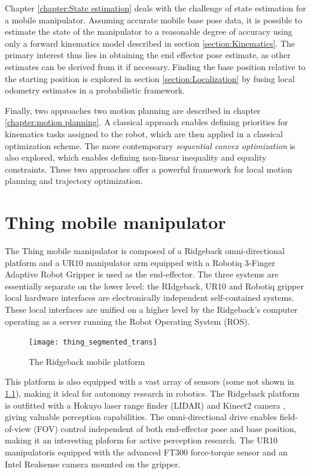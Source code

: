 \documentclass[times, utf8, diplomski, english]{fer}
\begin{document}
Chapter \ref{chapter:State estimation} deals with the challenge of state estimation for a mobile manipulator.
Assuming accurate mobile base pose data, it is possible to estimate the state of the manipulator to a reasonable degree of accuracy using only a forward kinematics model described in section \ref{section:Kinematics}.
The primary interest thus lies in obtaining the end effector pose estimate, as other estimates can be derived from it if necessary.
Finding the base position relative to the starting position is explored in section \ref{section:Localization} by fusing local odometry estimates in a probabilistic framework.

Finally, two approaches two motion planning are described in chapter \ref{chapter:motion planning}.
A classical approach enables defining priorities for kinematics tasks assigned to the robot, which are then applied in a classical optimization scheme.
The more contemporary \textit{sequential convex optimization} is also explored, which enables defining non-linear inequality and equality constraints. 
These two approaches offer a powerful framework for local motion planning and trajectory optimization.


\chapter{Thing mobile manipulator}\label{chapter:thing}
The Thing mobile manipulator is composed of a Ridgeback omni-directional platform and a UR10 manipulator arm equipped with a Robotiq 3-Finger Adaptive Robot Gripper is used as the end-effector.
The three systems are essentially separate on the lower level: the RIdgeback, UR10 and Robotiq gripper local hardware interfaces are electronically independent self-contained systems.
These local interfaces are unified on a higher level by the Ridgeback's computer operating as a server running the Robot Operating System (ROS).
\begin{figure}[h]
\label{figure:thing}
\centering
\texttt{[image: thing\_segmented\_trans]}
\caption{The Ridgeback mobile platform}
\end{figure}
This platform is also equipped with a vast array of sensors (some not shown in \ref{figure:thing}), making it ideal for autonomy research in robotics. 
The Ridgeback platform is outfitted with a Hokuyo laser range finder (LIDAR) and Kinect2 camera , giving valuable perception capabilities.
The omni-directional drive enables field-of-view (FOV) control independent of both end-effector pose and base position, making it an interesting plaform for active perception research.
The UR10 manipulatoris equipped with the advanced FT300 force-torque sensor and an Intel Realsense camera mounted on the gripper.
\end{document}
